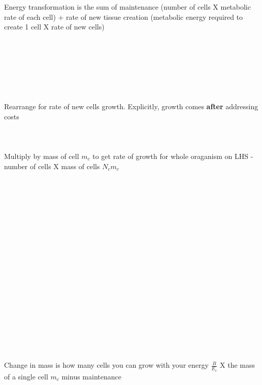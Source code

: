 \documentclass[a3paper]{article} %
\begin{document}
\begin{multicols}{2}
\columnbreak
Energy transformation is the sum of maintenance (number of cells X metabolic rate of each cell) + rate of new tissue creation (metabolic energy required to create 1 cell X rate of new cells) \\ \\ \\ \\ \\ \\ \\ \\
Rearrange for rate of new cells growth. Explicitly, growth comes \textbf{after} addressing costs \\ \\ \\ \\
Multiply by mass of cell $m_{c}$ to get rate of growth for whole oraganism on LHS - number of cells X mass of cells $N_{c}m_{c}$ \\ \\ \\ \\ \\ \\ \\ \\ \\ \\ \\ \\ \\ \\ \\ \\ \\ \\ \\ \\
Change in mass is how many cells you can grow with your energy $\frac{B}{E_c}$ X the mass of a single cell $m_c$ minus maintenance 
\endgroup
\end{multicols}
\newpage\let\mkbibnamefamily\textsc\printbibliography[title=Bibliography]\thispagestyle{empty} %
\end{document}
